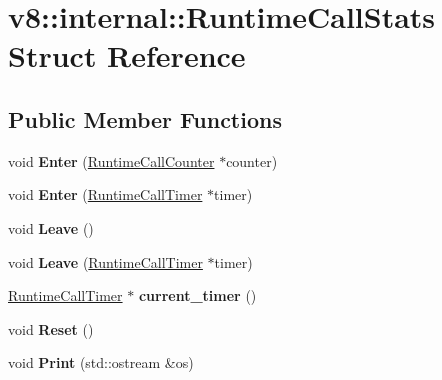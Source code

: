 \hypertarget{structv8_1_1internal_1_1_runtime_call_stats}{}\section{v8\+:\+:internal\+:\+:Runtime\+Call\+Stats Struct Reference}
\label{structv8_1_1internal_1_1_runtime_call_stats}
\subsection*{Public Member Functions}
\begin{DoxyCompactItemize}
\item 
void {\bfseries Enter} (\hyperlink{structv8_1_1internal_1_1_runtime_call_counter}{Runtime\+Call\+Counter} $\ast$counter)\hypertarget{structv8_1_1internal_1_1_runtime_call_stats_a90bfb6e479f86d9eba91dc6de1c8c1a3}{}\label{structv8_1_1internal_1_1_runtime_call_stats_a90bfb6e479f86d9eba91dc6de1c8c1a3}

\item 
void {\bfseries Enter} (\hyperlink{classv8_1_1internal_1_1_runtime_call_timer}{Runtime\+Call\+Timer} $\ast$timer)\hypertarget{structv8_1_1internal_1_1_runtime_call_stats_a2b364056ad630df88003c09af0f1d778}{}\label{structv8_1_1internal_1_1_runtime_call_stats_a2b364056ad630df88003c09af0f1d778}

\item 
void {\bfseries Leave} ()\hypertarget{structv8_1_1internal_1_1_runtime_call_stats_a37389c377c403cbbee7fa2c3796e7c5a}{}\label{structv8_1_1internal_1_1_runtime_call_stats_a37389c377c403cbbee7fa2c3796e7c5a}

\item 
void {\bfseries Leave} (\hyperlink{classv8_1_1internal_1_1_runtime_call_timer}{Runtime\+Call\+Timer} $\ast$timer)\hypertarget{structv8_1_1internal_1_1_runtime_call_stats_a5d5eeba49d474e5f679f0890dec5f4f9}{}\label{structv8_1_1internal_1_1_runtime_call_stats_a5d5eeba49d474e5f679f0890dec5f4f9}

\item 
\hyperlink{classv8_1_1internal_1_1_runtime_call_timer}{Runtime\+Call\+Timer} $\ast$ {\bfseries current\+\_\+timer} ()\hypertarget{structv8_1_1internal_1_1_runtime_call_stats_a9c1851ba664ce8878d40c2777d9bcc1b}{}\label{structv8_1_1internal_1_1_runtime_call_stats_a9c1851ba664ce8878d40c2777d9bcc1b}

\item 
void {\bfseries Reset} ()\hypertarget{structv8_1_1internal_1_1_runtime_call_stats_ab058d39c32704ceb58055dbb3e81db58}{}\label{structv8_1_1internal_1_1_runtime_call_stats_ab058d39c32704ceb58055dbb3e81db58}

\item 
void {\bfseries Print} (std\+::ostream \&os)\hypertarget{structv8_1_1internal_1_1_runtime_call_stats_a0caa1985c73712d7e45190c4b2e5a0f4}{}\label{structv8_1_1internal_1_1_runtime_call_stats_a0caa1985c73712d7e45190c4b2e5a0f4}

\end{DoxyCompactItemize}

